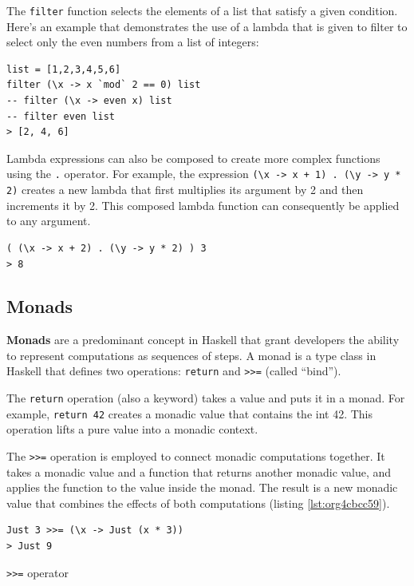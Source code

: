 \documentclass[a4paper, titlepage, twoside]{article}
\begin{document}
The \texttt{filter} function selects the elements of a list that satisfy a given condition. Here's an example that demonstrates the use of a lambda that is given to filter to select only the even numbers from a list of integers:

\begin{verbatim}
list = [1,2,3,4,5,6]
filter (\x -> x `mod` 2 == 0) list
-- filter (\x -> even x) list
-- filter even list
> [2, 4, 6]
\end{verbatim}

Lambda expressions can also be composed to create more complex functions using the \texttt{.} operator. For example, the expression \texttt{(\textbackslash{}x -> x + 1) .  (\textbackslash{}y -> y * 2)} creates a new lambda that first multiplies its argument by 2 and then increments it by 2. This composed lambda function can consequently be applied to any argument.

\begin{verbatim}
( (\x -> x + 2) . (\y -> y * 2) ) 3
> 8
\end{verbatim}

\subsection{Monads}
\label{sec:org2de4122}

\textbf{Monads} are a predominant concept in Haskell that grant developers the ability to represent computations as sequences of steps. A monad is a type class in Haskell that defines two operations: \texttt{return} and \texttt{>{}>{}=} (called ``bind'').

The \texttt{return} operation (also a keyword) takes a value and puts it in a monad. For example, \texttt{return 42} creates a monadic value that contains the int 42. This operation lifts a pure value into a monadic context.

The \texttt{>{}>{}=} operation is employed to connect monadic computations together. It takes a monadic value and a function that returns another monadic value, and applies the function to the value inside the monad. The result is a new monadic value that combines the effects of both computations (listing \ref{lst:org4cbcc59}).

\begin{listing}[htbp]
\begin{verbatim}
Just 3 >>= (\x -> Just (x * 3)) 
> Just 9
\end{verbatim}
\caption{\label{lst:org4cbcc59}\texttt{>{}>{}=} operator}
\end{listing}
\end{document}
